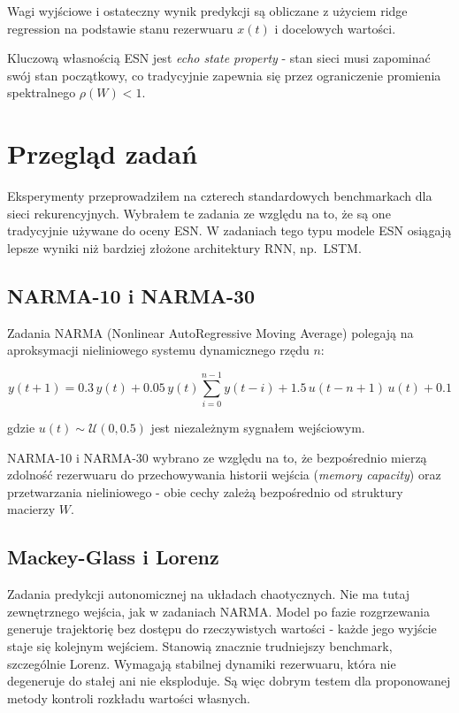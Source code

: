 \documentclass[12pt, a4paper]{article}
\begin{document}
Wagi wyjściowe i ostateczny wynik predykcji są obliczane z użyciem ridge regression na podstawie stanu rezerwuaru $x(t)$ i docelowych wartości.

Kluczową własnością ESN jest \emph{echo state property} - stan sieci musi zapominać swój stan początkowy, co tradycyjnie zapewnia się przez ograniczenie promienia spektralnego $\rho(W) < 1$.

\section{Przegląd zadań}

Eksperymenty przeprowadziłem na czterech standardowych benchmarkach dla sieci rekurencyjnych. Wybrałem te zadania ze względu na to, że są one tradycyjnie używane do oceny ESN. W zadaniach tego typu modele ESN osiągają lepsze wyniki niż bardziej złożone architektury RNN, np.\ LSTM.

\subsection{NARMA-10 i NARMA-30}

Zadania NARMA (Nonlinear AutoRegressive Moving Average) polegają na aproksymacji nieliniowego systemu dynamicznego rzędu $n$:

\begin{equation}
    y(t+1) = 0.3\, y(t) + 0.05\, y(t) \sum_{i=0}^{n-1} y(t-i) + 1.5\, u(t-n+1)\, u(t) + 0.1
\end{equation}

gdzie $u(t) \sim \mathcal{U}(0, 0.5)$ jest niezależnym sygnałem wejściowym.

NARMA-10 i NARMA-30 wybrano ze względu na to, że bezpośrednio mierzą zdolność rezerwuaru do przechowywania historii wejścia (\emph{memory capacity}) oraz przetwarzania nieliniowego - obie cechy zależą bezpośrednio od struktury macierzy $W$.

\subsection{Mackey-Glass i Lorenz}

Zadania predykcji autonomicznej na układach chaotycznych. Nie ma tutaj zewnętrznego wejścia, jak w zadaniach NARMA. Model po fazie rozgrzewania generuje trajektorię bez dostępu do rzeczywistych wartości - każde jego wyjście staje się kolejnym wejściem. Stanowią znacznie trudniejszy benchmark, szczególnie Lorenz. Wymagają stabilnej dynamiki rezerwuaru, która nie degeneruje do stałej ani nie eksploduje. Są więc dobrym testem dla proponowanej metody kontroli rozkładu wartości własnych.
\end{document}
